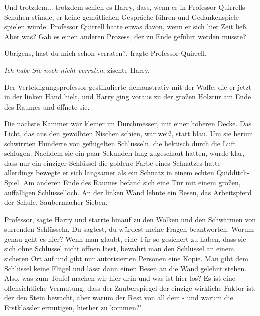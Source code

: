 Und trotzdem... trotzdem schien es Harry, dass, wenn er in Professor Quirrells
Schuhen stünde, er keine gemütlichen Gespräche führen und Gedankenspiele spielen
würde. Professor Quirrell hatte etwas davon, wenn er sich hier Zeit ließ. Aber
was? Gab es einen anderen Prozess, der zu Ende geführt werden musste?

\glqq{}Übrigens, hast du mich schon verraten?\grqq{}, fragte Professor Quirrell.

\glqq{}\emph{Ich habe Sie noch nicht verraten}\grqq{}, zischte Harry.

Der Verteidigungsprofessor gestikulierte demonstrativ mit der Waffe, die er
jetzt in der linken Hand hielt, und Harry ging voraus zu der großen Holztür am
Ende des Raumes und öffnete sie.

Die nächste Kammer war kleiner im Durchmesser, mit einer höheren Decke. Das
Licht, das aus den gewölbten Nischen schien, war weiß, statt blau. Um sie herum
schwirrten Hunderte von geflügelten Schlüsseln, die hektisch durch die Luft
schlugen. Nachdem sie ein paar Sekunden lang zugeschaut hatten, wurde klar, dass
nur ein einziger Schlüssel die goldene Farbe eines Schnatzes hatte - allerdings
bewegte er sich langsamer als ein Schnatz in einem echten Quidditch-Spiel. Am
anderen Ende des Raumes befand sich eine Tür mit einem großen, auffälligen
Schlüsselloch. An der linken Wand lehnte ein Besen, das Arbeitspferd der Schule,
Saubermacher Sieben.

\glqq{}Professor\grqq{}, sagte Harry und starrte hinauf zu den Wolken und den
Schwärmen von surrenden Schlüsseln, \glqq{}Du sagtest, du würdest meine Fragen
beantworten. Worum genau geht es hier? Wenn man glaubt, eine Tür so gesichert zu
haben, dass sie sich ohne Schlüssel nicht öffnen lässt, bewahrt man den
Schlüssel an einem sicheren Ort auf und gibt nur autorisierten Personen eine
Kopie. Man gibt dem Schlüssel keine Flügel und lässt dann einen Besen an die
Wand gelehnt stehen. Also, was zum Teufel machen wir hier drin und was ist hier
los? Es ist eine offensichtliche Vermutung, dass der Zauberspiegel der einzige
wirkliche Faktor ist, der den Stein bewacht, aber warum der Rest von all dem -
und warum die Erstklässler ermutigen, hierher zu kommen?"

